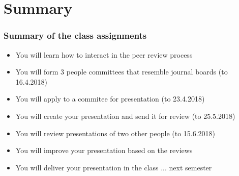\section{Summary}
\begin{frame}
\frametitle{Summary of the class assignments}
\begin{itemize}
\item You will learn how to interact in the peer review process
\item You will form 3 people committees that resemble journal boards (to 16.4.2018)
\item You will apply to a commitee for presentation (to 23.4.2018)
\item You will create your presentation and send it for review (to 25.5.2018)
\item You will review presentations of two other people (to 15.6.2018)
\item You will improve your presentation based on the reviews
\item You will deliver your presentation in the class ... next semester
\end{itemize}
\end{frame}

